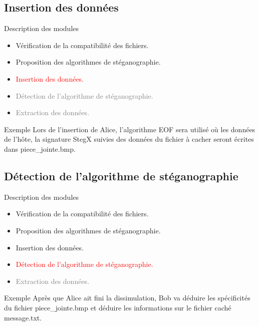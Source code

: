 \documentclass{beamer}
\begin{document}
  \subsection{Insertion des données}
  \begin{frame} %
	\begin{block}{Description des modules}
	\begin{itemize}
	[circle]
	\item Vérification de la compatibilité des fichiers.
	\item Proposition des algorithmes de stéganographie.
	\item \textcolor{red} {Insertion des données.}
	\item \textcolor{gray} {Détection de l'algorithme de stéganographie.}
	\item \textcolor{gray} {Extraction des données.}
	\end{itemize}
	\end{block}
	
	\begin{exampleblock}{Exemple} 
	Lors de l'insertion de Alice, l'algorithme EOF sera utilisé où 
	les données de l'hôte, la signature StegX suivies des données du fichier 
	à cacher seront écrites dans piece\_jointe.bmp. 
	\end{exampleblock}
  \end{frame}
  
	\subsection{Détection de l'algorithme de stéganographie}
  \begin{frame} %
	\begin{block}{Description des modules}
	\begin{itemize}
	[circle]
	\item Vérification de la compatibilité des fichiers.
	\item Proposition des algorithmes de stéganographie.
	\item Insertion des données.
	\item \textcolor{red} {Détection de l'algorithme de stéganographie.}
	\item \textcolor{gray} {Extraction des données.}
	\end{itemize}
	\end{block}
	
		\begin{exampleblock}{Exemple} 
	Après que Alice ait fini la dissimulation, Bob va déduire les spécificités
	du fichier piece\_jointe.bmp et déduire les informations sur le fichier 
	caché message.txt. 
	\end{exampleblock}
  \end{frame}
  
\end{document}
